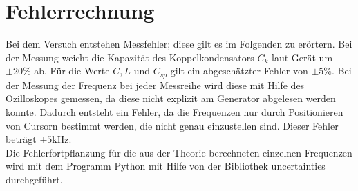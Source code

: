 \section{Fehlerrechnung}
 \label{fehlerrechnung}
Bei dem Versuch entstehen Messfehler;
diese gilt es im Folgenden zu erörtern.
Bei der Messung weicht die Kapazität des Koppelkondensators $C_k$ laut Gerät um $\pm 20 \%$ ab. Für die Werte $C,L $ und $C_{sp}$ gilt
ein abgeschätzter Fehler von  $\pm 5\si{\percent}$.
Bei der Messung der Frequenz bei jeder Messreihe
wird diese mit Hilfe des Ozilloskopes gemessen,
da diese nicht explizit am Generator abgelesen werden konnte.
Dadurch entsteht ein Fehler, da die Frequenzen
nur durch Positionieren von Cursorn bestimmt werden,
die nicht genau einzustellen sind. Dieser Fehler beträgt $\pm 5 \si{\kilo\hertz}$.
\\
Die Fehlerfortpflanzung für die aus der Theorie berechneten einzelnen Frequenzen
 wird mit%
dem Programm Python mit Hilfe von der Bibliothek uncertainties durchgeführt.
